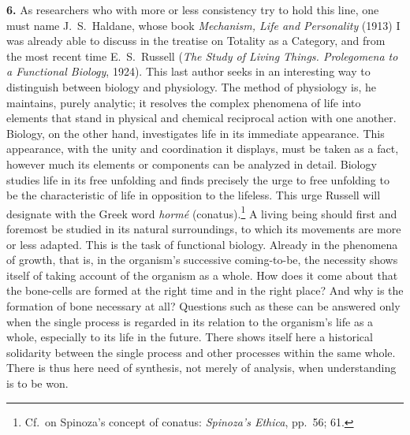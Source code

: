 \documentclass[12pt]{book}
\newcommand{\hnum}[1]{\textbf{#1.}\enspace}
\newcommand{\opage}[1]{\marginnote{\footnotesize\textit{[#1]}}}
\begin{document}
\hnum{6} As researchers who with more or less consistency try to hold this line, one must name \opage{24}J.\
S.\ Haldane, whose book \textit{Mechanism, Life and Personality} (1913) I was already able to
discuss in the treatise on Totality as a Category, and from the most recent time E.\ S.\ Russell
(\textit{The Study of Living Things. Prolegomena to a Functional Biology}, 1924). This last author
seeks in an interesting way to distinguish between biology and physiology. The method of physiology
is, he maintains, purely analytic; it resolves the complex phenomena of life into elements that
stand in physical and chemical reciprocal action with one another. Biology, on the other hand,
investigates life in its immediate appearance. This appearance, with the unity and coordination it
displays, must be taken as a fact, however much its elements or components can be analyzed in
detail. Biology studies life in its free unfolding and finds precisely the urge to free unfolding
to be the characteristic of life in opposition to the lifeless. This urge Russell will designate
with the Greek word \textit{hormé} (conatus).\footnote{Cf.\ on Spinoza's concept of conatus:
\textit{Spinoza's Ethica}, pp.\ 56; 61.} A living being should first and foremost be studied in its
natural surroundings, to which its movements are more or less adapted. This is the task of
functional biology. Already in the phenomena of growth, that is, in the organism's successive
coming-to-be, the necessity shows itself of taking account of the organism as a whole. How does it
come about that the bone-cells are formed at the right time and in the right place? And why is the
formation of bone necessary at all? Questions such as these can be answered only when the single
process is regarded in its relation to the organism's life as a whole, especially to its life in
the future. There shows itself here a historical solidarity between the single process and other
processes within \opage{25}the same whole. There is thus here need of synthesis, not merely of analysis, when
understanding is to be won.
\end{document}
